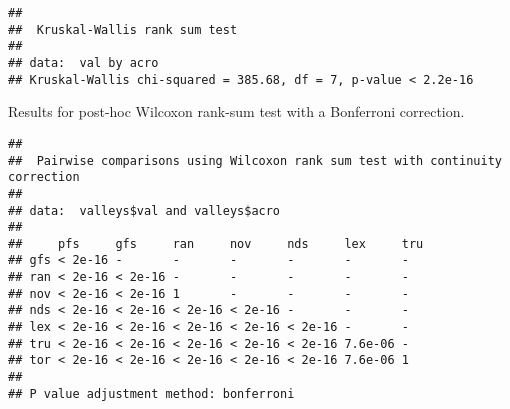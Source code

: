 \documentclass[]{book}
\newenvironment{Shaded}{\begin{snugshade}}{\end{snugshade}}
\newcommand{\DataTypeTok}[1]{\textcolor[rgb]{0.13,0.29,0.53}{#1}}
\newcommand{\KeywordTok}[1]{\textcolor[rgb]{0.13,0.29,0.53}{\textbf{#1}}}
\newcommand{\NormalTok}[1]{#1}
\newcommand{\OperatorTok}[1]{\textcolor[rgb]{0.81,0.36,0.00}{\textbf{#1}}}
\newcommand{\OtherTok}[1]{\textcolor[rgb]{0.56,0.35,0.01}{#1}}
\newcommand{\StringTok}[1]{\textcolor[rgb]{0.31,0.60,0.02}{#1}}
\begin{document}
\begin{verbatim}
## 
##  Kruskal-Wallis rank sum test
## 
## data:  val by acro
## Kruskal-Wallis chi-squared = 385.68, df = 7, p-value < 2.2e-16
\end{verbatim}

Results for post-hoc Wilcoxon rank-sum test with a Bonferroni correction.

\begin{Shaded}
\end{Shaded}

\begin{verbatim}
## 
##  Pairwise comparisons using Wilcoxon rank sum test with continuity correction 
## 
## data:  valleys$val and valleys$acro 
## 
##     pfs     gfs     ran     nov     nds     lex     tru
## gfs < 2e-16 -       -       -       -       -       -  
## ran < 2e-16 < 2e-16 -       -       -       -       -  
## nov < 2e-16 < 2e-16 1       -       -       -       -  
## nds < 2e-16 < 2e-16 < 2e-16 < 2e-16 -       -       -  
## lex < 2e-16 < 2e-16 < 2e-16 < 2e-16 < 2e-16 -       -  
## tru < 2e-16 < 2e-16 < 2e-16 < 2e-16 < 2e-16 7.6e-06 -  
## tor < 2e-16 < 2e-16 < 2e-16 < 2e-16 < 2e-16 7.6e-06 1  
## 
## P value adjustment method: bonferroni
\end{verbatim}
\end{document}
